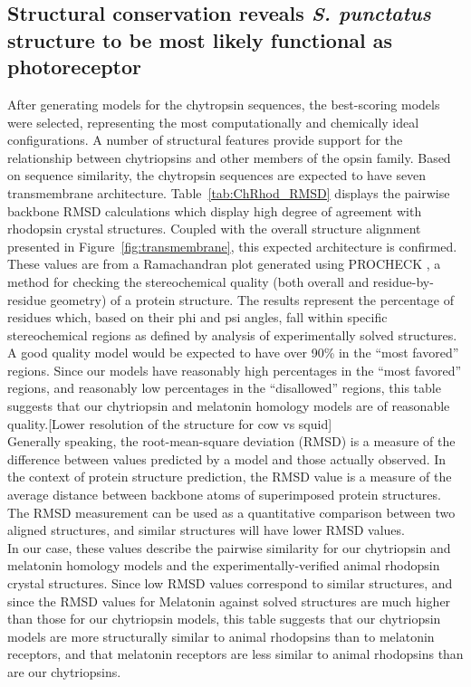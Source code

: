 \subsection{Structural conservation reveals \textit{S. punctatus} structure to be most likely functional as photoreceptor}
\indent After generating models for the chytropsin sequences, the best-scoring models were selected, representing the most computationally and chemically ideal configurations. A number of structural features provide support for the relationship between chytriopsins and other members of the opsin family. Based on sequence similarity, the chytropsin sequences are expected to have seven transmembrane architecture. Table~\ref{tab:ChRhod_RMSD} displays the pairwise backbone RMSD calculations which display high degree of agreement with rhodopsin crystal structures. Coupled with the overall structure alignment presented in Figure~\ref{fig:transmembrane}, this expected architecture is confirmed. \\
\indent These values are from a Ramachandran plot \cite{Ramachandran1963} generated using PROCHECK \cite{Laskowski1993}, a method for checking the stereochemical quality (both overall and residue-by-residue geometry) of a protein structure. The results represent the percentage of residues which, based on their phi and psi angles, fall within specific stereochemical regions as defined by analysis of experimentally solved structures. A good quality model would be expected to have over 90\% in the “most favored” regions. Since our models have reasonably high percentages in the “most favored” regions, and reasonably low percentages in the “disallowed” regions, this table suggests that our chytriopsin and melatonin homology models are of reasonable quality.[Lower resolution of the structure for cow vs squid] \\
\indent Generally speaking, the root-mean-square deviation (RMSD) is a measure of the difference between values predicted by a model and those actually observed. In the context of protein structure prediction, the RMSD value is a measure of the average distance between backbone atoms of superimposed protein structures. The RMSD measurement can be used as a quantitative comparison between two aligned structures, and similar structures will have lower RMSD values. \\
\indent In our case, these values describe the pairwise similarity for our chytriopsin and melatonin homology models and the experimentally-verified animal rhodopsin crystal structures. Since low RMSD values correspond to similar structures, and since the RMSD values for Melatonin against solved structures are much higher than those for our chytriopsin models, this table suggests that our chytriopsin models are more structurally similar to animal rhodopsins than to melatonin receptors, and that melatonin receptors are less similar to animal rhodopsins than are our chytriopsins.\\
